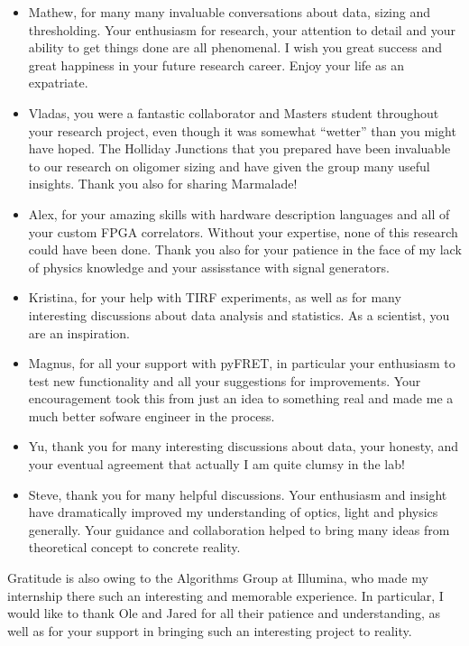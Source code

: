 \begin{itemize}
\item[] Mathew, for many many invaluable conversations about data, sizing and thresholding. Your enthusiasm for research, your attention to detail and your ability to get things done are all phenomenal. I wish you great success and great happiness in your future research career. Enjoy your life as an expatriate.
\item[] Vladas, you were a fantastic collaborator and Masters student throughout your research project, even though it was somewhat ``wetter'' than you might have hoped. The Holliday Junctions that you prepared have been invaluable to our research on oligomer sizing and have given the group many useful insights. Thank you also for sharing Marmalade!
\item[] Alex, for your amazing skills with hardware description languages and all of your custom FPGA correlators. Without your expertise, none of this research could have been done. Thank you also for your patience in the face of my lack of physics knowledge and your assisstance with signal generators.
\item[] Kristina, for your help with TIRF experiments, as well as for many interesting discussions about data analysis and statistics. As a scientist, you are an inspiration.
\item[] Magnus, for all your support with pyFRET, in particular your enthusiasm to test new functionality and all your suggestions for improvements. Your encouragement took this from just an idea to something real and made me a much better sofware engineer in the process.
\item[] Yu, thank you for many interesting discussions about data, your honesty, and your eventual agreement that actually I am quite clumsy in the lab!
\item[] Steve, thank you for many helpful discussions. Your enthusiasm and insight have dramatically improved my understanding of optics, light and physics generally. Your guidance and collaboration helped to bring many ideas from theoretical concept to concrete reality.
\end{itemize}

Gratitude is also owing to the Algorithms Group at Illumina, who made my internship there such an interesting and memorable experience. In particular, I would like to thank Ole and Jared for all their patience and understanding, as well as for your support in bringing such an interesting project to reality.

